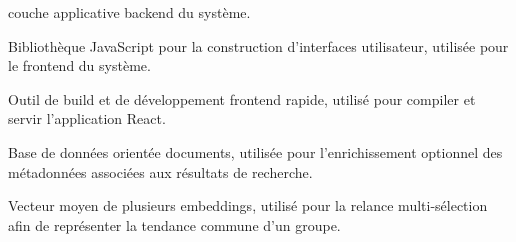 \documentclass[12pt,a4paper]{article}
\newcommand{\NewMajorPart}{\clearpage}
\begin{document}
\begin{description}[leftmargin=7em, style=sameline]
                    couche applicative backend du système.
  \item[React]      Bibliothèque JavaScript pour la construction d'interfaces utilisateur,
                    utilisée pour le frontend du système.
  \item[Vite]       Outil de build et de développement frontend rapide, utilisé pour
                    compiler et servir l'application React.
  \item[MongoDB]    Base de données orientée documents, utilisée pour l'enrichissement
                    optionnel des métadonnées associées aux résultats de recherche.
  \item[Centroïde]  Vecteur moyen de plusieurs embeddings, utilisé pour la relance
                    multi-sélection afin de représenter la tendance commune d'un groupe.
\end{description}

\NewMajorPart
\printindex

\end{document}
